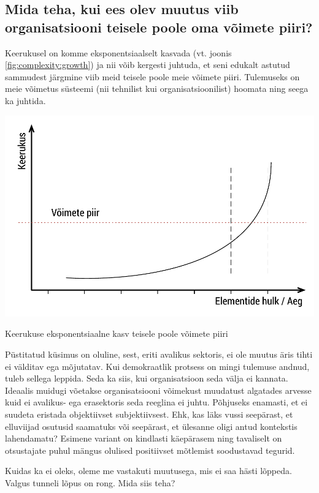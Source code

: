 \documentclass{tufte-book}
\begin{document}
\subsection{Mida teha, kui ees olev muutus viib organisatsiooni teisele poole oma võimete piiri?}
Keerukusel on komme eksponentsiaalselt kasvada (vt. joonis \ref{fig:complexity:growth}) ja nii võib kergesti juhtuda, et seni edukalt astutud sammudest järgmine viib meid teisele poole meie võimete piiri. Tulemuseks on meie võimetus süsteemi (nii tehnilist kui organisatsioonilist) hoomata ning seega ka juhtida. 

\begin{marginfigure}
		\includegraphics[width=\linewidth]{keerukus.pdf}
		\caption{Keerukuse eksponentsiaalne kasv teisele poole võimete piiri}
		\label{fig:complexity:growth}
\end{marginfigure}


Püstitatud küsimus on oluline, sest, eriti avalikus sektoris, ei ole muutus äris tihti ei välditav ega mõjutatav. Kui demokraatlik protsess on mingi tulemuse andnud, tuleb sellega leppida. Seda ka siis, kui organisatsioon seda välja ei kannata. Ideaalis muidugi võetakse organisatsiooni võimekust muudatust algatades arvesse kuid ei avalikus- ega erasektoris seda reeglina ei juhtu. Põhjuseks enamasti, et ei suudeta eristada objektiivset subjektiivsest. Ehk, kas läks vussi seepärast, et elluviijad osutusid saamatuks või seepärast, et ülesanne oligi antud kontekstis lahendamatu? Esimene variant on kindlasti käepärasem ning tavaliselt on otsustajate puhul mängus olulised positiivset mõtlemist soodustavad tegurid. 

Kuidas ka ei oleks, oleme me vastakuti muutusega, mis ei saa hästi lõppeda. Valgus tunneli lõpus on rong. Mida siis teha? 
\end{document}
